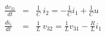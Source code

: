 \begin{eqnarray*}
  \frac{dv_{31}}{dt} &=& \frac{1}{C}\ i_2 = -\frac{1}{C}i_1 +
  \frac{1}{C} u\\
  \frac{di_{i}}{dt} &=& \frac{1}{L}\ v_{32} = \frac{1}{L}v_{31} -\frac{R}{L} i_1
\end{eqnarray*}
\endinput
